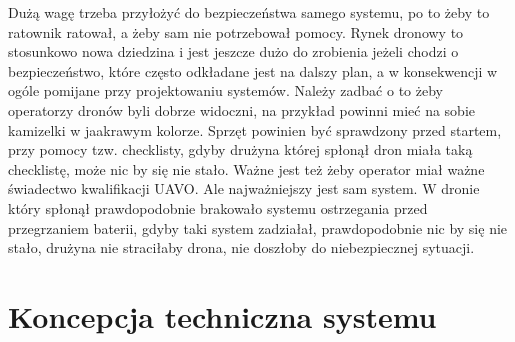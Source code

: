 Dużą wagę trzeba przyłożyć do bezpieczeństwa samego systemu, po to żeby to ratownik ratował, a żeby sam nie potrzebował pomocy. Rynek dronowy to stosunkowo nowa dziedzina i jest jeszcze dużo do zrobienia jeżeli chodzi o bezpieczeństwo, które często odkładane jest na dalszy plan, a w konsekwencji w ogóle pomijane przy projektowaniu systemów. Należy zadbać o to żeby operatorzy dronów byli dobrze widoczni, na przykład powinni mieć na sobie kamizelki w jaakrawym kolorze. Sprzęt powinien być sprawdzony przed startem, przy pomocy tzw. checklisty, gdyby drużyna której spłonął dron miała taką checklistę, może nic by się nie stało. Ważne jest też żeby operator miał ważne świadectwo kwalifikacji UAVO. Ale najważniejszy jest sam system. W dronie który spłonął prawdopodobnie brakowało systemu ostrzegania przed przegrzaniem baterii, gdyby taki system zadziałał, prawdopodobnie nic by się nie stało, drużyna nie straciłaby drona, nie doszłoby do niebezpiecznej sytuacji.

\section{Koncepcja techniczna systemu}

